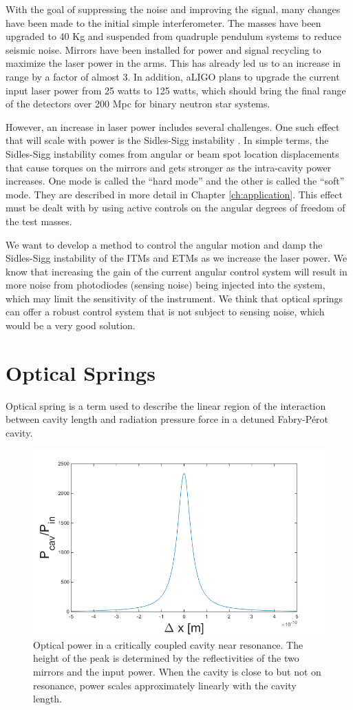 With the goal of suppressing the noise and improving the signal, many changes have been made to the initial simple interferometer. The masses have been upgraded to 40 Kg and suspended from quadruple pendulum systems to reduce seismic noise. Mirrors have been installed for power and signal recycling to maximize the laser power in the arms. This has already led us to an increase in range by a factor of almost 3. In addition, aLIGO plans to upgrade the current input laser power from 25 watts to 125 watts, which should bring the final range of the detectors over 200 Mpc for binary neutron star systems. 

However, an increase in laser power includes several challenges. One such effect that will scale with power is the Sidles-Sigg instability \cite{Sidles06}. 
In simple terms, the Sidles-Sigg instability comes from angular or beam spot location displacements that cause torques on the mirrors and gets stronger as the intra-cavity power increases. 
One mode is called the ``hard mode'' and the other is called the ``soft'' mode. They are described in more detail in Chapter \ref{ch:application}. 
This effect must be dealt with by using active controls on the angular degrees of freedom of the test masses.

We want to develop a method to control the angular motion and damp the Sidles-Sigg instability of the ITMs and ETMs as we increase the laser power.  We know that increasing the gain of the current angular control system will result in more noise from photodiodes (sensing noise) being injected into the system, which may limit the sensitivity of the instrument. We think that optical springs can offer a robust control system that is not subject to sensing noise, which would be a very good solution.

\section{Optical Springs}

Optical spring is a term used to describe the linear region of the interaction between cavity length and radiation pressure force in a detuned Fabry-P\'erot cavity.  



\begin{figure}[htbp]%
\center
\includegraphics[width=.5\textwidth]{figures/introduction/pcav}%
\caption[Cavity power near resonance]{Optical power in a critically coupled cavity near resonance. The height of the peak is determined by the reflectivities of the two mirrors and the input power. When the cavity is close to but not on resonance, power scales approximately linearly with the cavity length.}%
\label{fig:pcav}%
\end{figure}

